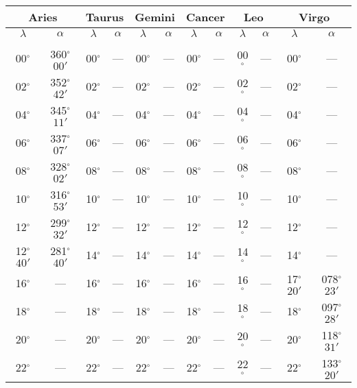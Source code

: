 \clearpage
\begin{table}
\centering
{\small \begin{tabular}{cc|cc|cc|cc|cc|cc}
\multicolumn{2}{c}{Aries}\vline & \multicolumn{2}{c}{Taurus} \vline& \multicolumn{2}{c}{Gemini} \vline& \multicolumn{2}{c}{Cancer}\vline &
\multicolumn{2}{c}{Leo}\vline & \multicolumn{2}{c}{Virgo}\\\hline
$\lambda$& $\alpha$& $\lambda$& $\alpha$& $\lambda$& $\alpha$& $\lambda$& $\alpha$& $\lambda$& $\alpha$& $\lambda$& $\alpha$\\\hline
&&&&&&&&&&&\\[-2ex]
00$^\circ$ & 360$^\circ$$00'$ & 00$^\circ$ & --- & 00$^\circ$ & --- & 00$^\circ$ & --- & 00$^\circ$ & --- & 00$^\circ$ & ---\\
02$^\circ$ & 352$^\circ$$42'$ & 02$^\circ$ & --- & 02$^\circ$ & --- & 02$^\circ$ & --- & 02$^\circ$ & --- & 02$^\circ$ & ---\\
04$^\circ$ & 345$^\circ$$11'$ & 04$^\circ$ & --- & 04$^\circ$ & --- & 04$^\circ$ & --- & 04$^\circ$ & --- & 04$^\circ$ & ---\\
06$^\circ$ & 337$^\circ$$07'$ & 06$^\circ$ & --- & 06$^\circ$ & --- & 06$^\circ$ & --- & 06$^\circ$ & --- & 06$^\circ$ & ---\\
08$^\circ$ & 328$^\circ$$02'$ & 08$^\circ$ & --- & 08$^\circ$ & --- & 08$^\circ$ & --- & 08$^\circ$ & --- & 08$^\circ$ & ---\\
10$^\circ$ & 316$^\circ$$53'$ & 10$^\circ$ & --- & 10$^\circ$ & --- & 10$^\circ$ & --- & 10$^\circ$ & --- & 10$^\circ$ & ---\\
12$^\circ$ & 299$^\circ$$32'$ & 12$^\circ$ & --- & 12$^\circ$ & --- & 12$^\circ$ & --- & 12$^\circ$ & --- & 12$^\circ$ & ---\\
12$^\circ$$40'$ & 281$^\circ$$40'$& 14$^\circ$ & --- & 14$^\circ$ & --- & 14$^\circ$ & --- & 14$^\circ$ & --- & 14$^\circ$ & ---\\
16$^\circ$ & --- & 16$^\circ$ & --- & 16$^\circ$ & --- & 16$^\circ$ & --- & 16$^\circ$ & --- & 17$^\circ$$20'$ & 078$^\circ$$23'$\\
18$^\circ$ & --- & 18$^\circ$ & --- & 18$^\circ$ & --- & 18$^\circ$ & --- & 18$^\circ$ & --- & 18$^\circ$ & 097$^\circ$$28'$\\
20$^\circ$ & --- & 20$^\circ$ & --- & 20$^\circ$ & --- & 20$^\circ$ & --- & 20$^\circ$ & --- & 20$^\circ$ & 118$^\circ$$31'$\\
22$^\circ$ & --- & 22$^\circ$ & --- & 22$^\circ$ & --- & 22$^\circ$ & --- & 22$^\circ$ & --- & 22$^\circ$ & 133$^\circ$$20'$\\

\end{tabular}}
\end{table}
